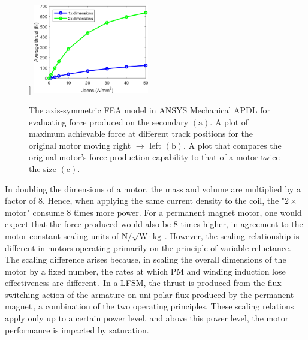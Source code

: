 \begin{figure}[!ht]
                    ]{
                    \includegraphics[width=0.45\textwidth]{chap4/images2/LFSM_scaling_effect.png}
                }
                \caption{ 
                    \label{fig:hap/rsm/LFSM/periodic_fea} The axis-symmetric \acs{FEA} model in ANSYS Mechanical APDL for evaluating force produced on the secondary $\mathrm{(a)}$. 
                    A plot of maximum achievable force at different track positions for
                    the original motor moving right $\rightarrow$ left $\mathrm{(b)}$.
                    A plot that compares the original motor's force production capability to that of a motor twice the size $\mathrm{(c)}$.
                }
            \end{figure}
    
        
            In doubling the dimensions of a motor, the mass and volume are multiplied by a factor of $8$. Hence, when applying the same current density to the coil, the "$2\times$ motor" consume $8$ times more power. For a permanent magnet motor, one would expect that the force produced would also be $8$ times higher, in agreement to the motor constant scaling units of $\mathrm{N/\sqrt{W\cdot kg}}$\,\cite{Ruddy2011DesignMotors}. However, the scaling relationship is different in motors operating primarily on the principle of variable reluctance. The scaling difference arises because, in scaling the overall dimensions of the motor by a fixed number, the rates at which PM and winding induction lose effectiveness are different\,\cite{Melcher1981ContinuumElectromechanics}. In a \acs{LFSM}, the thrust is produced from the flux-switching action of the armature on uni-polar flux produced by the permanent magnet\,\cite{Cheng2011}, a combination of the two operating principles. These scaling relations apply only up to a certain power level, and above this power level, the motor performance is impacted by saturation.  
    
